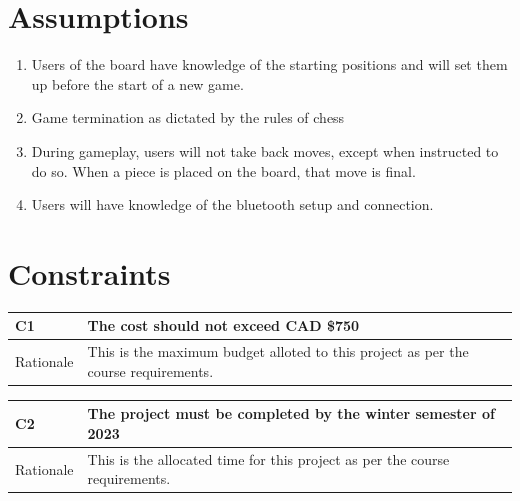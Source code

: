 \documentclass[12pt]{article}
\begin{document}
\section{Assumptions}

\begin{enumerate}[{A}1., leftmargin=2\parindent]
    \item Users of the board have knowledge of the starting positions and will
    set them up before the start of a new game.  \\
    \item Game termination as dictated by the rules of chess \cite{RulesofChess} \\
    \item {During gameplay, users will not take back moves, except when instructed to do so. When a piece is placed
    on the board, that move is final.} \\
    \item Users will have knowledge of the bluetooth setup and connection. \\
\end{enumerate}

\section{Constraints}

\begin{table}[H]
  \centering
      \setlength{\leftmargini}{0.4cm}
      \begin{tabular}{| >{\centering\arraybackslash}m{3cm} | 
        >{\centering\arraybackslash}m{12cm} |}
      \hline
      \rowcolor[gray]{0.9}
      C1 & The cost should not exceed CAD \$750\\
      \hline 
      Rationale & This is the maximum budget alloted to this project as per the course requirements.\\
      \hline 
      \end{tabular}
  \label{Table}
  \end{table}
  
\begin{table}[H]
  \centering
      \setlength{\leftmargini}{0.4cm}
      \begin{tabular}{| >{\centering\arraybackslash}m{3cm} | 
        >{\centering\arraybackslash}m{12cm} |}
      \hline
      \rowcolor[gray]{0.9}
      C2 & The project must be completed by the winter semester of 2023\\
      \hline 
      Rationale & This is the allocated time for this project as per the course requirements.\\
      \hline 
      \end{tabular}
  \label{Table}
  \end{table}  
\end{document}
